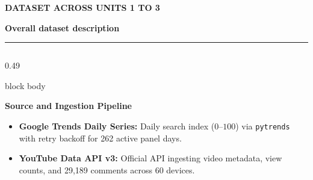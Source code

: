\documentclass[aspectratio=169, 10pt]{beamer}
\newcommand{\slideheader}[3]{%
        \vspace{-0.25cm}%
        \noindent\begin{minipage}[t]{0.88\linewidth}%
            {\fontsize{7pt}{8.5pt}\selectfont \textbf{\color{BlueAccent}#1}}\par\vspace{1pt}%
            {\fontsize{11.5pt}{13.5pt}\selectfont \textbf{\color{NavyPrimary}#2}}%
        \end{minipage}%
        \hfill%
        \begin{minipage}[t]{0.10\linewidth}%
            \raggedleft{\fontsize{12pt}{14pt}\selectfont \textbf{\color{CoralAccent}#3}}%
        \end{minipage}\par%
        \vspace{2pt}%
        \textcolor{CardBorder}{\rule{\linewidth}{0.6pt}}\par%
        \vspace{3pt}%
    }
\newenvironment{card}[1][]{%
        \begin{beamercolorbox}[rounded=true,shadow=false,wd=\linewidth,sep=3.5pt,#1]{block body}%
        \fontsize{7.8pt}{9.8pt}\selectfont%
    }{%
        \end{beamercolorbox}%
    }
\begin{document}
    \begin{frame}[t]                                                                                                                                                                                   
        \slideheader{DATASET ACROSS UNITS 1 TO 3}{Overall dataset description}{04}                                                                                                                     
        \begin{columns}[T]                                                                                                                                                                             
            \begin{column}{0.49\textwidth}                                                                                                                                                             
                \begin{card}                                                                                                                                                                           
                    \textbf{\color{NavyPrimary}Source and Ingestion Pipeline}\\[0.03cm]                                                                                                                
                    \begin{itemize}\setlength{\itemsep}{1.2pt}                                                                                                                                         
                        \item \textbf{Google Trends Daily Series:} Daily search index ($0$--$100$) via \texttt{pytrends} with retry backoff for 262 active panel days.                                 
                        \item \textbf{YouTube Data API v3:} Official API ingesting video metadata, view counts, and 29,189 comments across 60 devices.                                                 

\end{itemize}
\end{card}
\end{column}
\end{columns}
\end{frame}
\end{document}
